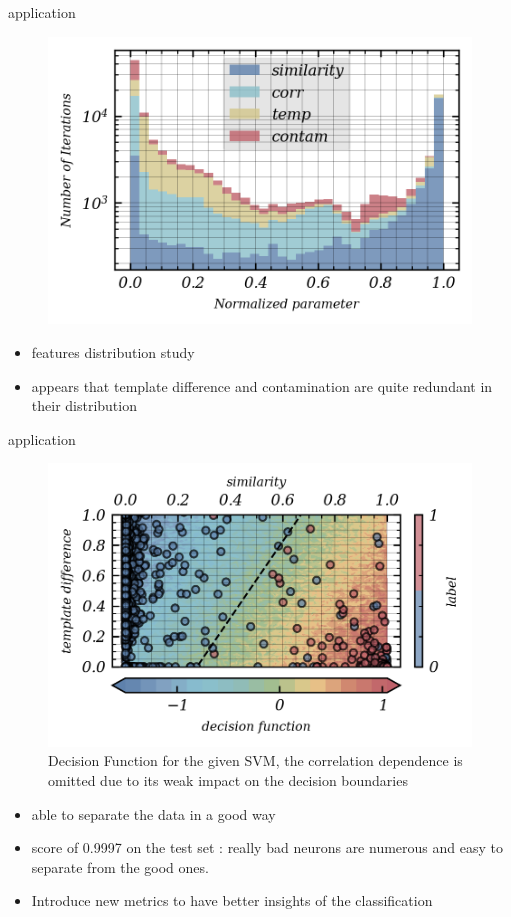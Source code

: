 \documentclass[numbering=fraction]{beamer}
\begin{document}
\begin{frame}{application}
    \begin{figure}[H]
        \includegraphics[width = .6\linewidth]{./figure/param_distrib.png}
    \end{figure}
    \begin{itemize}
        \item features distribution study
        \item appears that template difference and contamination are quite redundant in their distribution
    \end{itemize}
\end{frame}
\begin{frame}{application}
    \begin{figure}[H]
        \includegraphics[width = .5\linewidth]{./figure/decision_function.png}
        \caption{\scriptsize{Decision Function for the given SVM, the correlation dependence is omitted due to its weak impact on the decision boundaries}}
    \end{figure}
    \begin{itemize}
        \item able to separate the data in a good way
        \item score of 0.9997 on the test set : really bad neurons are numerous and easy to separate from the good ones.
        \item Introduce new metrics to have better insights of the classification
    \end{itemize}
\end{frame}
\end{document}

